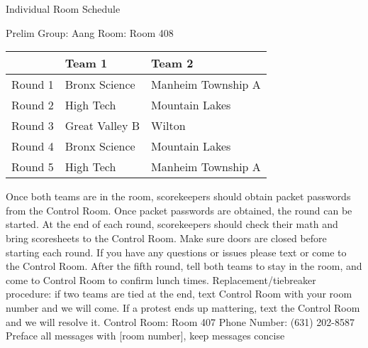 \documentclass{article}%
\begin{document}
\newpage%
\begin{center}%
\begin{Huge}%
Individual Room Schedule%
\end{Huge}%
\vspace*{16pt}%
\linebreak%
\begin{Large}%
Prelim Group: Aang \hfill Room: Room 408%
\end{Large}%
\end{center}%
%
\begin{tabularx}{\textwidth}{|c|Y|Y|}%
\hline%
&Team 1&Team 2\\%
\hline%
Round 1&Bronx Science&Manheim Township A\\%
Round 2&High Tech&Mountain Lakes\\%
Round 3&Great Valley B&Wilton\\%
Round 4&Bronx Science&Mountain Lakes\\%
Round 5&High Tech&Manheim Township A\\%
\hline%
\end{tabularx}%
\vspace*{16pt}%
\linebreak%
Once both teams are in the room, scorekeepers should obtain packet passwords from the Control Room. Once packet passwords are obtained, the round can be started. At the end of each round, scorekeepers should check their math and bring scoresheets to the Control Room.\newline%
\newline%
Make sure doors are closed before starting each round. If you have any questions or issues please text or come to the Control Room.\newline%
\newline%
After the fifth round, tell both teams to stay in the room, and come to Control Room to confirm lunch times.\newline%
\newline%
Replacement/tiebreaker procedure: if two teams are tied at the end, text Control Room with your room number and we will come. If a protest ends up mattering, text the Control Room and we will resolve it.\newline%
\newline%
Control Room: Room 407\newline%
Phone Number: (631) 202{-}8587\newline%
Preface all messages with {[}room number{]}, keep messages concise%
\end{document}
